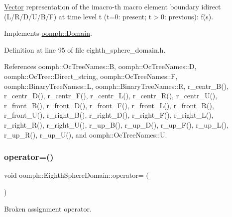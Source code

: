 \hyperlink{classoomph_1_1Vector}{Vector} representation of the imacro-\/th macro element boundary idirect (L/\+R/\+D/\+U/\+B/F) at time level t (t=0\+: present; t$>$0\+: previous)\+: f(s). 



Implements \hyperlink{classoomph_1_1Domain_a95f3e00d28ea37e6c4d3027bfac91096}{oomph\+::\+Domain}.



Definition at line 95 of file eighth\+\_\+sphere\+\_\+domain.\+h.



References oomph\+::\+Oc\+Tree\+Names\+::B, oomph\+::\+Oc\+Tree\+Names\+::D, oomph\+::\+Oc\+Tree\+::\+Direct\+\_\+string, oomph\+::\+Oc\+Tree\+Names\+::F, oomph\+::\+Binary\+Tree\+Names\+::L, oomph\+::\+Binary\+Tree\+Names\+::R, r\+\_\+centr\+\_\+\+B(), r\+\_\+centr\+\_\+\+D(), r\+\_\+centr\+\_\+\+F(), r\+\_\+centr\+\_\+\+L(), r\+\_\+centr\+\_\+\+R(), r\+\_\+centr\+\_\+\+U(), r\+\_\+front\+\_\+\+B(), r\+\_\+front\+\_\+\+D(), r\+\_\+front\+\_\+\+F(), r\+\_\+front\+\_\+\+L(), r\+\_\+front\+\_\+\+R(), r\+\_\+front\+\_\+\+U(), r\+\_\+right\+\_\+\+B(), r\+\_\+right\+\_\+\+D(), r\+\_\+right\+\_\+\+F(), r\+\_\+right\+\_\+\+L(), r\+\_\+right\+\_\+\+R(), r\+\_\+right\+\_\+\+U(), r\+\_\+up\+\_\+\+B(), r\+\_\+up\+\_\+\+D(), r\+\_\+up\+\_\+\+F(), r\+\_\+up\+\_\+\+L(), r\+\_\+up\+\_\+\+R(), r\+\_\+up\+\_\+\+U(), and oomph\+::\+Oc\+Tree\+Names\+::U.

\mbox{\label{classoomph_1_1EighthSphereDomain_a3533eb2f34986e995a779d2841267b12}} 
\subsubsection{\texorpdfstring{operator=()}{operator=()}}
{\footnotesize\ttfamily void oomph\+::\+Eighth\+Sphere\+Domain\+::operator= (\begin{DoxyParamCaption}\item[{const \hyperlink{classoomph_1_1EighthSphereDomain}{Eighth\+Sphere\+Domain} \&}]{ }\end{DoxyParamCaption})\hspace{0.3cm}{\ttfamily [inline]}}



Broken assignment operator. 



